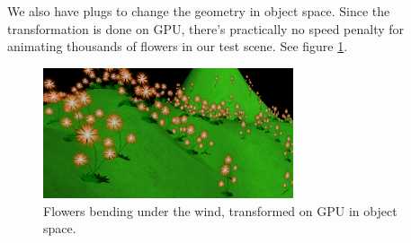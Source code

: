 \documentclass{egpubl}
\begin{document}


We also have plugs to change the geometry in object space.
Since the transformation is done on GPU, there's practically
no speed penalty for animating thousands of flowers in our test scene.
See figure \ref{fig_flowers}.

\setcounter{figure}{8}
\begin{figure}[H]
  \centering
  \includegraphics[width=2.9in]{flowers-cropped}
  \caption{Flowers bending under the wind, transformed on GPU in object space.}
  \label{fig_flowers}
\end{figure}
\end{document}
